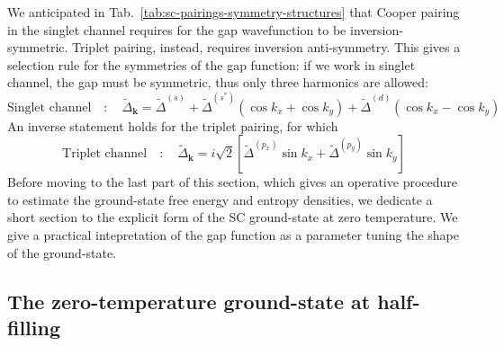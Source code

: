 We anticipated in Tab.~\ref{tab:sc-pairings-symmetry-structures} that Cooper pairing in the singlet channel requires for the gap wavefunction to be inversion-symmetric. Triplet pairing, instead, requires inversion anti-symmetry.
This gives a selection rule for the symmetries of the gap function: if we work in singlet channel, the gap must be symmetric, thus only three harmonics are allowed:
\[
	\text{Singlet channel}
	\quad\colon\quad
	\tilde{\Delta}_\mathbf{k} = \tilde{\Delta}^{(s)} + \tilde{\Delta}^{(s^*)} (\cos k_x + \cos k_y) + \tilde{\Delta}^{(d)} (\cos k_x - \cos k_y)
\]
An inverse statement holds for the triplet pairing, for which
\[
	\text{Triplet channel}
	\quad\colon\quad
	\tilde{\Delta}_\mathbf{k} = i\sqrt{2} \left[
		\tilde{\Delta}^{(p_x)} \sin k_x +  \tilde{\Delta}^{(p_y)} \sin k_y
	\right]
\]
Before moving to the last part of this section, which gives an operative procedure to estimate the ground-state free energy and entropy densities, we dedicate a short section to the explicit form of the SC ground-state at zero temperature. We give a practical intepretation of the gap function as a parameter tuning the shape of the ground-state.

\subsection{The zero-temperature ground-state at half-filling}\label{subsec:sc-gs}


